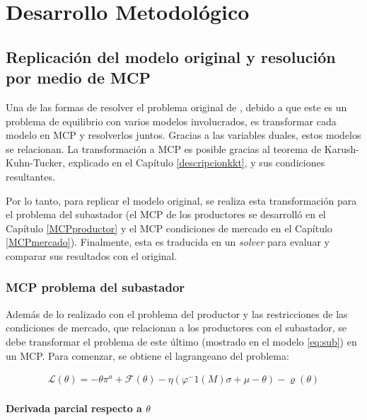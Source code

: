
\chapter{Desarrollo Metodológico} \label{MCP:subastador} %


\section{Replicación del modelo original y resolución por medio de MCP}

Una de las formas de resolver el problema original de , debido a que este es un problema de equilibrio con varios modelos involucrados, es transformar cada modelo en MCP y resolverlos juntos. Gracias a las variables duales, estos modelos se relacionan. La transformación a MCP es posible gracias al teorema de Karush-Kuhn-Tucker, explicado en el Capítulo \ref{descripcionkkt}, y sus condiciones resultantes. 
\vspace{2.5mm}

Por lo tanto, para replicar el modelo original, se realiza esta transformación para el problema del subastador (el MCP de los productores se desarrolló en el Capítulo \ref{MCPproductor} y el MCP condiciones de mercado en el Capítulo \ref{MCPmercado}). Finalmente, esta es traducida en un \textit{solver} para evaluar y comparar sus resultados con el original.

\subsection{MCP problema del subastador} \label{MCPsubastador}

Además de lo realizado con el problema del productor y las restricciones de las condiciones de mercado, que relacionan a los productores con el subastador, se debe transformar el problema de este último (mostrado en el modelo \ref{eq:sub}) en un MCP.  Para comenzar, se obtiene el lagrangeano del problema:

\begin{footnotesize}
\begin{align}
\mathcal{L}(\theta) = -\theta\pi^a + \mathcal{F}(\theta) - \eta (\varphi^-1(M)\sigma+\mu-\theta) - \varrho(\theta)  \label{eq:lagrange2}
\end{align}
\end{footnotesize}


\subsubsection{Derivada parcial respecto a $\theta$}

